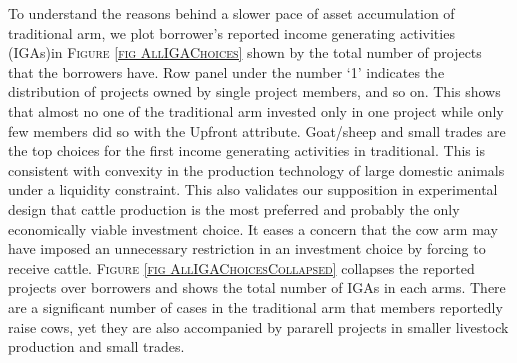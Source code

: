 \begin{figure}
\end{figure}

	To understand the reasons behind a slower pace of asset accumulation of \textsf{traditional} arm, we plot borrower's reported income generating activities (IGAs)in \textsc{\small Figure \ref{fig AllIGAChoices}} shown by the total number of projects that the borrowers have. Row panel under the number `1' indicates the distribution of projects owned by single project members, and so on. This shows that almost no one of the \textsf{traditional} arm invested only in one project while only few members did so with the \textsf{Upfront} attribute. Goat/sheep and small trades are the top choices for the first income generating activities in \textsf{traditional}. This is consistent with convexity in the production technology of large domestic animals under a liquidity constraint. This also validates our supposition in experimental design that cattle production is the most preferred and probably the only economically viable investment choice. It eases a concern that the \textsf{cow} arm may have imposed an unnecessary restriction in an investment choice by forcing to receive cattle. \textsc{\small Figure \ref{fig AllIGAChoicesCollapsed}} collapses the reported projects over borrowers and shows the total number of IGAs in each arms. There are a significant number of cases in the \textsf{traditional} arm that members reportedly raise cows, yet they are also accompanied by pararell projects in smaller livestock production and small trades. 

